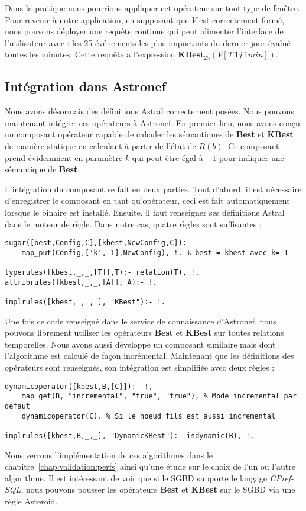 Dans la pratique nous pourrions appliquer cet opérateur sur tout type de fenêtre. Pour revenir à notre application, en supposant que $V$ est correctement formé, nous pouvons déployer une requête continue qui peut alimenter l'interface de l'utilisateur avec : les 25 événements les plus importants du dernier jour évalué toutes les minutes. Cette requête a l'expression $\textbf{KBest}_{25}(V[T\ 1j\ 1min])$.

\subsection{Intégration dans Astronef}
Nous avons désormais des définitions Astral correctement posées. Nous pouvons maintenant intégrer ces opérateurs à Astronef. En premier lieu, nous avons conçu un composant opérateur capable de calculer les sémantiques de \textbf{Best} et \textbf{KBest} de manière statique en calculant à partir de l'état de $R(b)$. Ce composant prend évidemment en paramètre $k$ qui peut être égal à $-1$ pour indiquer une sémantique de \textbf{Best}.

L'intégration du composant se fait en deux parties. Tout d'abord, il est nécessaire d'enregistrer le composant en tant qu'opérateur, ceci est fait automatiquement lorsque le binaire est installé. Ensuite, il faut renseigner ses définitions Astral dans le moteur de règle. Dans notre cas, quatre règles sont suffisantes :
\begin{lstlisting}
sugar([best,Config,C],[kbest,NewConfig,C]):-
    map_put(Config,['k',-1],NewConfig), !. % best = kbest avec k=-1

typerules([kbest,_,_,[T]],T):- relation(T), !.
attribrules([kbest,_,_,[A]], A):- !.

implrules([kbest,_,_,_], "KBest"):- !.
\end{lstlisting}

Une fois ce code renseigné dans le service de connaissance d'Astronef, nous pouvons librement utiliser les opérateurs \textbf{Best} et \textbf{KBest} sur toutes relations temporelles. Nous avons aussi développé un composant similaire mais dont l'algorithme est calculé de façon incrémental. Maintenant que les définitions des opérateurs sont renseignés, son intégration est simplifiée avec deux règles :
\begin{lstlisting}
dynamicoperator([kbest,B,[C]]):- !,
    map_get(B, "incremental", "true", "true"), % Mode incremental par defaut
    dynamicoperator(C). % Si le noeud fils est aussi incremental

implrules([kbest,B,_,_], "DynamicKBest"):- isdynamic(B), !.
\end{lstlisting}

Nous verrons l'implémentation de ces algorithmes dans le chapitre~\ref{chap:validation:perfs} ainsi qu'une étude sur le choix de l'un ou l'autre algorithme. Il est intéressant de voir que si le SGBD supporte le langage \textit{CPref-SQL}, nous pouvons pousser les opérateurs \textbf{Best} et \textbf{KBest} sur le SGBD via une règle Asteroid. 